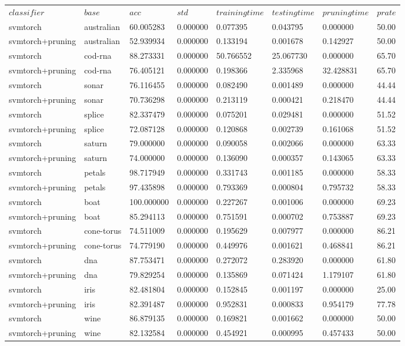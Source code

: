 \documentclass[8pt]{article}
\begin{document}
\begin{center}
\begin{tabular}{|l|l|l|l|l|l|l|l|}
\hline
$classifier$&$base$&$acc$&$std$&$trainingtime$&$testingtime$&$pruningtime$&$prate$\\
svmtorch&australian&60.005283&0.000000&0.077395&0.043795&0.000000&50.00\\
svmtorch+pruning&australian&52.939934&0.000000&0.133194&0.001678&0.142927&50.00\\
svmtorch&cod-rna&88.273331&0.000000&50.766552&25.067730&0.000000&65.70\\
svmtorch+pruning&cod-rna&76.405121&0.000000&0.198366&2.335968&32.428831&65.70\\
svmtorch&sonar&76.116455&0.000000&0.082490&0.001489&0.000000&44.44\\
svmtorch+pruning&sonar&70.736298&0.000000&0.213119&0.000421&0.218470&44.44\\
svmtorch&splice&82.337479&0.000000&0.075201&0.029481&0.000000&51.52\\
svmtorch+pruning&splice&72.087128&0.000000&0.120868&0.002739&0.161068&51.52\\
svmtorch&saturn&79.000000&0.000000&0.090058&0.002066&0.000000&63.33\\
svmtorch+pruning&saturn&74.000000&0.000000&0.136090&0.000357&0.143065&63.33\\
svmtorch&petals&98.717949&0.000000&0.331743&0.001185&0.000000&58.33\\
svmtorch+pruning&petals&97.435898&0.000000&0.793369&0.000804&0.795732&58.33\\
svmtorch&boat&100.000000&0.000000&0.227267&0.001006&0.000000&69.23\\
svmtorch+pruning&boat&85.294113&0.000000&0.751591&0.000702&0.753887&69.23\\
svmtorch&cone-torus&74.511009&0.000000&0.195629&0.007977&0.000000&86.21\\
svmtorch+pruning&cone-torus&74.779190&0.000000&0.449976&0.001621&0.468841&86.21\\
svmtorch&dna&87.753471&0.000000&0.272072&0.283920&0.000000&61.80\\
svmtorch+pruning&dna&79.829254&0.000000&0.135869&0.071424&1.179107&61.80\\
svmtorch&iris&82.481804&0.000000&0.152845&0.001197&0.000000&25.00\\
svmtorch+pruning&iris&82.391487&0.000000&0.952831&0.000833&0.954179&77.78\\
svmtorch&wine&86.879135&0.000000&0.169821&0.001662&0.000000&50.00\\
svmtorch+pruning&wine&82.132584&0.000000&0.454921&0.000995&0.457433&50.00\\
\hline
\end{tabular}
\end{center}
\end{document}
